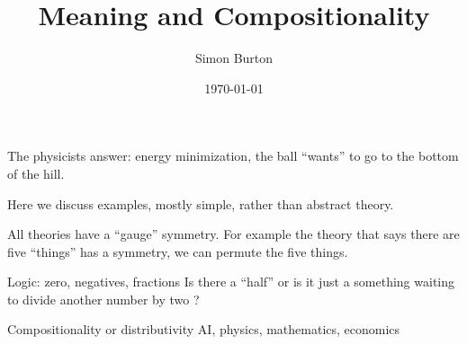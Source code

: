\documentclass[11pt]{article}
\begin{document}

%

\title{Meaning and Compositionality}

\author{Simon Burton}

\date{\today}


\maketitle


\def\N{\mathbb N}
\def\Z{\mathbb Z}
\def\R{\mathbb R}
\def\C{\mathbb C}
\def\Sets{\mathbb B}
\def\Expect{\mathbb E}
\def\Ind{\mathbb I}
\def\Complex{\mathbb{C}}
\def\GL{\mathrm{GL}}
\def\half{\frac{1}{2}}
\def\todo#1{\emph{(XXX #1 XXX)}}
\def\tensor{\otimes}
\def\tr{\mbox{tr}}
\def\det{\mbox{det}}


%
%


The physicists answer: energy minimization, the ball ``wants'' to
go to the bottom of the hill.

Here we discuss examples, mostly simple, rather than abstract theory.

All theories have a ``gauge'' symmetry. For example the theory that
says there are five ``things'' has a symmetry, we can permute the five
things.

Logic: zero, negatives, fractions
Is there a ``half'' or is it just a something waiting
to divide another number by two ?

Compositionality or distributivity
AI, physics, mathematics, economics
\end{document}
